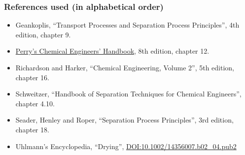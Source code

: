 \begin{frame}\frametitle{References used (in alphabetical order)}
	\begin{itemize}
		\item	Geankoplis, ``Transport Processes and Separation Process Principles'', 4th edition, chapter 9.
		\item	\href{http://accessengineeringlibrary.com/browse/perrys-chemical-engineers-handbook-eighth-edition}{Perry's Chemical Engineers' Handbook}, 8th edition, chapter 12.
		\item	Richardson and Harker, ``Chemical Engineering, Volume 2'', 5th edition, chapter 16.
		\item	Schweitzer, ``Handbook of Separation Techniques for Chemical Engineers'', chapter 4.10.
		\item	Seader, Henley and Roper, ``Separation Process Principles'', 3rd edition, chapter 18.
		\item	Uhlmann's Encyclopedia, ``Drying'', {\tiny \href{http://dx.doi.org/10.1002/14356007.b02\_04.pub2}{DOI:10.1002/14356007.b02\_04.pub2}}
	\end{itemize}
\end{frame}